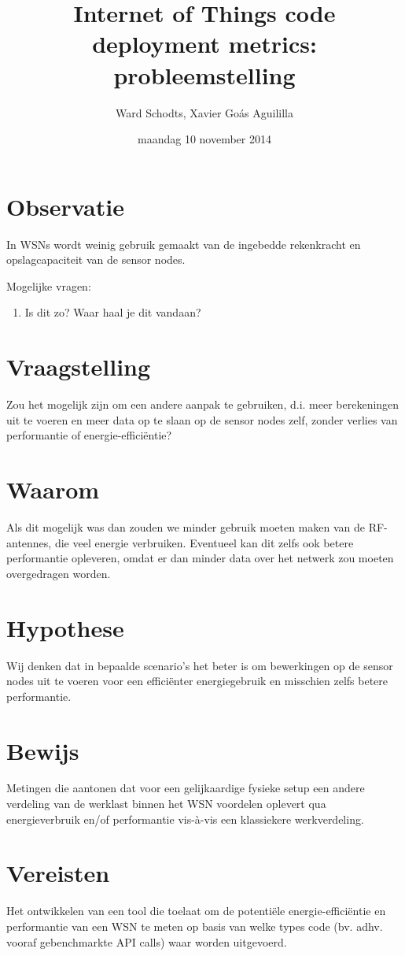 \documentclass[11pt]{article}
\author{Ward Schodts, Xavier Goás Aguililla}
\date{maandag 10 november 2014}
\title{Internet of Things code deployment metrics: probleemstelling}
\begin{document}
\maketitle

\section{Observatie}
\label{sec-1}
In WSNs wordt weinig gebruik gemaakt van de ingebedde rekenkracht en
opslagcapaciteit van de sensor nodes.

Mogelijke vragen: 

\begin{enumerate}
\item Is dit zo? Waar haal je dit vandaan?
\end{enumerate}
\section{Vraagstelling}
\label{sec-2}
Zou het mogelijk zijn om een andere aanpak te gebruiken, d.i. meer
berekeningen uit te voeren en meer data op te slaan op de sensor nodes
zelf, zonder verlies van performantie of energie-efficiëntie?
\section{Waarom}
\label{sec-3}
Als dit mogelijk was dan zouden we minder gebruik moeten maken van de
RF-antennes, die veel energie verbruiken. Eventueel kan dit zelfs ook
betere performantie opleveren, omdat er dan minder data over het
netwerk zou moeten overgedragen worden.
\section{Hypothese}
\label{sec-4}
Wij denken dat in bepaalde scenario's het beter is om bewerkingen op
de sensor nodes uit te voeren voor een efficiënter energiegebruik en
misschien zelfs betere performantie.
\section{Bewijs}
\label{sec-5}
Metingen die aantonen dat voor een gelijkaardige fysieke setup een
andere verdeling van de werklast binnen het WSN voordelen oplevert qua
energieverbruik en/of performantie vis-à-vis een klassiekere
werkverdeling.
\section{Vereisten}
\label{sec-6}
Het ontwikkelen van een tool die toelaat om de potentiële
energie-efficiëntie en performantie van een WSN te meten op basis van
welke types code (bv. adhv. vooraf gebenchmarkte API calls) waar
worden uitgevoerd.
\end{document}
